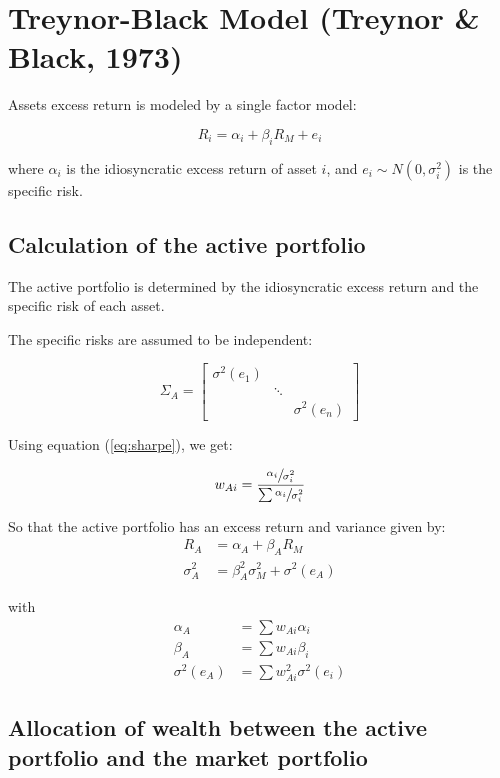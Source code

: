 \documentclass[
  11pt,
]{article}
\begin{document}
\hypertarget{treynor-black-model-treynor1973}{%
\section{Treynor-Black Model (Treynor \& Black,
1973)}\label{treynor-black-model-treynor1973}}

Assets excess return is modeled by a single factor model:

\[
R_i = \alpha_i + \beta_i R_M + e_i
\]

where \(\alpha_i\) is the idiosyncratic excess return of asset \(i\),
and \(e_i \sim N(0, \sigma^2_i)\) is the specific risk.

\hypertarget{calculation-of-the-active-portfolio}{%
\subsection{Calculation of the active
portfolio}\label{calculation-of-the-active-portfolio}}

The active portfolio is determined by the idiosyncratic excess return
and the specific risk of each asset.

The specific risks are assumed to be independent:

\[
\Sigma_A = \begin{bmatrix}
\sigma^2(e_1) & & \\
& \ddots & \\
& & \sigma^2(e_n) \end{bmatrix}
\]

Using equation (\ref{eq:sharpe}), we get:

\[
w_{Ai} = \frac{\sfrac{\alpha_i}{\sigma^2_i}}{\sum \sfrac{\alpha_i}{\sigma^2_i} }
\]

So that the active portfolio has an excess return and variance given by:
\begin{align*}
R_A &= \alpha_A + \beta_A R_M \\
\sigma^2_A &= \beta^2_A \sigma^2_M + \sigma^2(e_A)
\end{align*}

with \begin{align*}
\alpha_A &= \sum w_{Ai} \alpha_i \\
\beta_A &= \sum w_{Ai} \beta_i \\
\sigma^2(e_A) &= \sum w^2_{Ai} \sigma^2(e_i)
\end{align*}

\hypertarget{allocation-of-wealth-between-the-active-portfolio-and-the-market-portfolio}{%
\subsection{Allocation of wealth between the active portfolio and the
market
portfolio}\label{allocation-of-wealth-between-the-active-portfolio-and-the-market-portfolio}}
\end{document}
